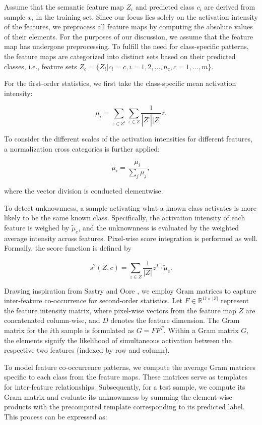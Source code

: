 \documentclass{gji}
\begin{document}
    Assume that the semantic feature map $Z_i$ and predicted class $c_i$ are derived from sample $x_i$ in the training set. Since our focus lies solely on the activation intensity of the features, we preprocess all feature maps by computing the absolute values of their elements. For the purposes of our discussion, we assume that the feature map has undergone preprocessing. To fulfill the need for class-specific patterns, the feature maps are categorized into distinct sets based on their predicted classes, i.e., feature sets $Z_c = \{Z_{i} | c_i = c, i = 1, 2, \ldots, n_c, c = 1, \ldots, m\}$.

    For the first-order statistics, we first take the class-specific mean activation intensity:
    
    \[ \mu_i =  \sum_{z \in Z^i} \sum_{z \in Z} \frac{1}{|Z^i| |Z|} z. \tag{14} \label{14} \]
    
    To consider the different scales of the activation intensities for different features, a normalization cross categories is further applied:
    
    \[ \tilde{\mu}_i = \frac{\mu_i}{\sum_{j} \mu_j}, \tag{15} \label{eq15} \]
    
    where the vector division is conducted elementwise.
    
    To detect unknownness, a sample activating what a known class activates is more likely to be the same known class. Specifically, the activation intensity of each feature is weighed by $\tilde{\mu}_c$, and the unknownness is evaluated by the weighted average intensity across features. Pixel-wise score integration is performed as well. Formally, the score function is defined by
    
    \[ s^2(Z, c) = \sum_{z \in Z} \frac{1}{|Z|} z^T \cdot \tilde{\mu}_c. \tag{16} \]

    Drawing inspiration from Sastry and Oore \cite{33}, we employ Gram matrices to capture inter-feature co-occurrence for second-order statistics. Let $F \in \mathbb{R}^{D \times |Z|}$ represent the feature intensity matrix, where pixel-wise vectors from the feature map $Z$ are concatenated column-wise, and $D$ denotes the feature dimension. The Gram matrix for the $i$th sample is formulated as $G = FF^T$. Within a Gram matrix $G$, the elements signify the likelihood of simultaneous activation between the respective two features (indexed by row and column).

    To model feature co-occurrence patterns, we compute the average Gram matrices specific to each class from the feature maps. These matrices serve as templates for inter-feature relationships. Subsequently, for a test sample, we compute its Gram matrix and evaluate its unknownness by summing the element-wise products with the precomputed template corresponding to its predicted label. This process can be expressed as:
    
\end{document}
